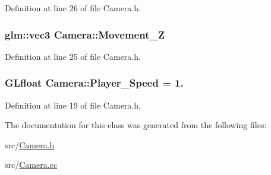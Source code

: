 Definition at line 26 of file Camera.\+h.

\hypertarget{class_camera_a61b6a55a798d329e9cbc5116d859c9b0}{}
\subsubsection[{Movement\+\_\+\+Z}]{\setlength{\rightskip}{0pt plus 5cm}glm\+::vec3 Camera\+::\+Movement\+\_\+\+Z}\label{class_camera_a61b6a55a798d329e9cbc5116d859c9b0}


Definition at line 25 of file Camera.\+h.

\hypertarget{class_camera_ab20174a89f86b685216dfe825e9ce95d}{}
\subsubsection[{Player\+\_\+\+Speed}]{\setlength{\rightskip}{0pt plus 5cm}G\+Lfloat Camera\+::\+Player\+\_\+\+Speed = 1.}\label{class_camera_ab20174a89f86b685216dfe825e9ce95d}


Definition at line 19 of file Camera.\+h.



The documentation for this class was generated from the following files\+:\begin{DoxyCompactItemize}
\item 
src/\hyperlink{_camera_8h}{Camera.\+h}\item 
src/\hyperlink{_camera_8cc}{Camera.\+cc}\end{DoxyCompactItemize}
